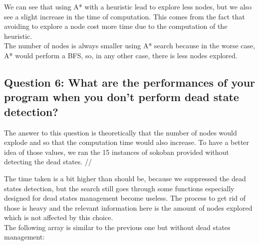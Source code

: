 \documentclass[a4paper,10pt]{article}
\begin{document}
			We can see that using A* with a heuristic lead to explore less nodes, but we also see a slight increase in the time of computation. This comes from the fact that avoiding to explore a node cost more time due to the computation of the heuristic.\\
			The number of nodes is always smaller using A* search because in the worse case, A* would perform a BFS, so, in any other case, there is less nodes explored.
			
		
		\subsection{Question 6: What are the performances of your program when you don’t perform dead state detection?}
			The answer to this question is theoretically that the number of nodes would explode and so that the computation time would also increase. To have a better idea of those values, we ran the 15 instances of sokoban provided without detecting the dead states. //
			
			The time taken is a bit higher than should be, because we suppressed the dead states detection, but the search still goes through some functions especially designed for dead states management become useless. The process to get rid of those is heavy and the relevant information here is the amount of nodes explored which is not affected by this choice.\\
			The following array is similar to the previous one but without dead states management:\\
			
			
\end{document}
